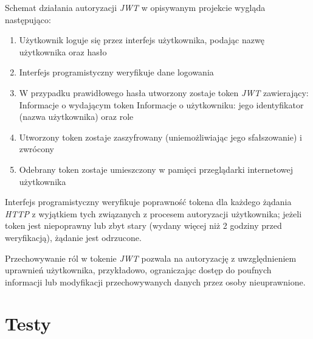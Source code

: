 \documentclass[eng,printmode,openany]{mgr}
\begin{document}
	Schemat działania autoryzacji \textit{JWT} w opisywanym projekcie wygląda następująco:
	\begin{enumerate}
		\item Użytkownik loguje się przez interfejs użytkownika, podając nazwę użytkownika oraz hasło
		\item Interfejs programistyczny weryfikuje dane logowania
		\item W przypadku prawidłowego hasła utworzony zostaje token \textit{JWT} zawierający:
		\subitem Informacje o wydającym token
		\subitem Informacje o użytkowniku: jego identyfikator (nazwa użytkownika) oraz role
		\item Utworzony token zostaje zaszyfrowany (uniemożliwiając jego sfałszowanie) i zwrócony	
		\item Odebrany token zostaje umieszczony w pamięci przeglądarki internetowej użytkownika
	\end{enumerate}
	Interfejs programistyczny weryfikuje poprawność tokena dla każdego żądania \textit{HTTP} z wyjątkiem tych związanych z procesem autoryzacji użytkownika; jeżeli token jest niepoprawny lub zbyt stary (wydany więcej niż 2 godziny przed weryfikacją), żądanie jest odrzucone.
	
	Przechowywanie ról w tokenie \textit{JWT} pozwala na autoryzację z uwzględnieniem uprawnień użytkownika, przykładowo, ograniczając dostęp do poufnych informacji lub modyfikacji przechowywanych danych przez osoby nieuprawnione.
	
	
	
	\newpage
	\chapter{Testy}
\end{document}
